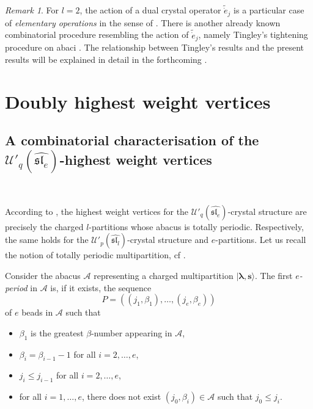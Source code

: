 \documentclass[twoside,12pt]{amsart}
\theoremstyle{plain}
\newcommand{\cA}{\mathcal{A}}
\newcommand{\bs}{\mathbf{s}}
\newcommand{\be}{\beta}
\newcommand{\la}{\lambda}
\newcommand{\bla}{\boldsymbol{\la}}
\newcommand{\tde}{\tilde{\dot{e}}}
\newcommand{\Ue}{\mathcal{U}'_q (\widehat{\mathfrak{sl}_e})}
\newcommand{\Ul}{\mathcal{U}'_p (\widehat{\mathfrak{sl}_l})}
\theoremstyle{remark}
\newtheorem{rem}[num]{Remark}
\begin{document}
\begin{rem}\label{rem_comm_crys}
For $l=2$, the action of a dual crystal operator $\tde_j$
is a particular case of \textit{elementary operations}
in the sense of \cite[Section 7.3]{GerberHissJacon2015}.
There is another already known combinatorial procedure resembling the action of $\tde_j$,
namely Tingley's tightening procedure on abaci \cite[Definition 3.8]{Tingley2008}.
The relationship between Tingley's results and the present results will be explained in detail in
the forthcoming \cite{Gerber2016a}.
\end{rem}















\section{Doubly highest weight vertices}\label{doubly_hw}

\subsection{A combinatorial characterisation of the $\Ue$-highest weight vertices}\label{doubly_hw_char}\

According to \cite{JaconLecouvey2012}, the highest weight vertices for the $\Ue$-crystal structure are
precisely the charged $l$-partitions whose abacus is totally periodic.
Respectively, the same holds for the $\Ul$-crystal structure and $e$-partitions.
Let us recall the notion of totally periodic multipartition, cf \cite[Definition 2.2]{JaconLecouvey2012}.

Consider the abacus $\cA$ representing a charged multipartition $|\bla,\bs\rangle$.
The first \textit{$e$-period} in $\cA$ is, if it exists, the sequence 
$$P=((j_1,\be_1), \dots, (j_e,\be_e))$$
of $e$ beads in $\cA$ such that
\begin{itemize}
 \item $\be_1$ is the greatest $\be$-number appearing in $\cA$,
 \item $\be_i = \be_{i-1}-1$ for all $i=2,\dots,e$,
 \item $j_i \leq j_{i-1}$ for all $i=2,\dots,e$,
 \item for all $i=1,\dots,e$, there does not exist $(j_0,\be_i)\in\cA$ such that $j_0\leq j_i$.
\end{itemize}
\end{document}
